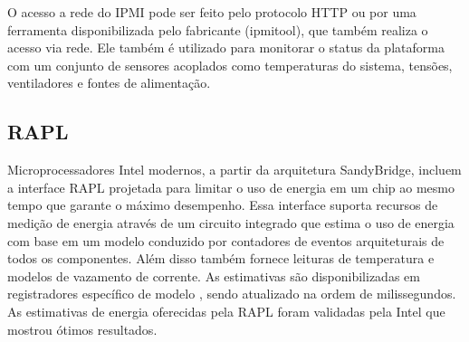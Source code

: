 O  acesso a rede do IPMI pode ser feito pelo protocolo HTTP ou por uma ferramenta disponibilizada pelo fabricante (ipmitool), que também realiza o acesso via rede. Ele também é utilizado para monitorar o status da plataforma com um conjunto de sensores acoplados como temperaturas do sistema, tensões, ventiladores e fontes de alimentação.

\subsection{RAPL}

Microprocessadores Intel modernos, a partir da arquitetura SandyBridge, incluem a interface RAPL \cite{Rotem2012, Hahnel2012, Hackenberg2015} projetada para limitar o uso de energia em um chip ao mesmo tempo que garante o máximo desempenho. Essa interface suporta recursos de medição de energia através de um circuito integrado que estima o uso de energia com base em um modelo conduzido por contadores de eventos arquiteturais de todos os componentes. Além disso também fornece leituras de temperatura e modelos de vazamento de corrente. As estimativas são disponibilizadas em registradores específico de modelo , sendo atualizado na ordem de milissegundos. As estimativas de energia oferecidas pela RAPL foram validadas pela Intel que mostrou ótimos resultados.